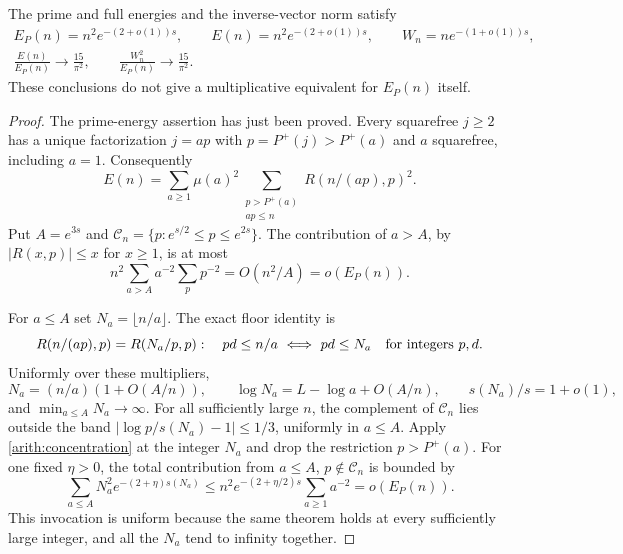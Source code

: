 \begin{theorem}\label{arith:energy}
The prime and full energies and the inverse-vector norm satisfy
\begin{gather}
 E_P(n)=n^2e^{-(2+o(1))s},\qquad
 E(n)=n^2e^{-(2+o(1))s},\qquad W_n=ne^{-(1+o(1))s},
 \label{arith:energy-scale}\\
 \frac{E(n)}{E_P(n)}\longrightarrow\frac{15}{\pi^2},\qquad
 \frac{W_n^2}{E_P(n)}\longrightarrow\frac{15}{\pi^2}.
 \label{arith:energy-ratio}
\end{gather}
These conclusions do not give a multiplicative equivalent for $E_P(n)$ itself.
\end{theorem}
\begin{proof}
The prime-energy assertion has just been proved. Every squarefree $j\ge2$
has a unique factorization $j=ap$ with $p=P^+(j)>P^+(a)$ and $a$
squarefree, including $a=1$. Consequently
\begin{equation}\label{arith:multiplier-decomposition}
 E(n)=\sum_{a\ge1}\mu(a)^2
       \sum_{\substack{p>P^+(a)\\ap\le n}}R(n/(ap),p)^2.
\end{equation}
Put $A=e^{3s}$ and $\mathcal C_n=\{p:e^{s/2}\le p\le e^{2s}\}$.
The contribution of $a>A$, by $|R(x,p)|\le x$ for $x\ge1$, is at most
\[
 n^2\sum_{a>A}a^{-2}\sum_p p^{-2}=O(n^2/A)=o(E_P(n)).
\]

For $a\le A$ set $N_a=\lfloor n/a\rfloor$. The exact floor identity is
\begin{equation}\label{arith:floor}
 R(n/(ap),p)=R(N_a/p,p):
 \quad pd\le n/a\ \Longleftrightarrow\ pd\le N_a
 \quad\hbox{for integers }p,d.
\end{equation}
Uniformly over these multipliers,
\[
 N_a=(n/a)(1+O(A/n)),\qquad
 \log N_a=L-\log a+O(A/n),\qquad s(N_a)/s=1+o(1),
\]
and $\min_{a\le A}N_a\to\infty$.
For all sufficiently large $n$, the complement of $\mathcal C_n$ lies
outside the band $|\log p/s(N_a)-1|\le1/3$, uniformly in $a\le A$.
Apply \eqref{arith:concentration} at the integer $N_a$ and drop the
restriction $p>P^+(a)$. For one fixed $\eta>0$, the total contribution
from $a\le A$, $p\notin\mathcal C_n$ is bounded by
\[
 \sum_{a\le A}N_a^2e^{-(2+\eta)s(N_a)}
 \le n^2e^{-(2+\eta/2)s}\sum_{a\ge1}a^{-2}=o(E_P(n)).
\]
This invocation is uniform because the same theorem holds at every
sufficiently large integer, and all the $N_a$ tend to infinity together.


\end{proof}
